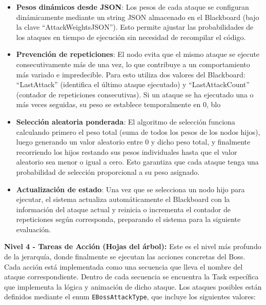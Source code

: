 \documentclass[informe]{upropuesta}
\begin{document}
\begin{itemize}
    \item \textbf{Pesos dinámicos desde JSON}: Los pesos de cada ataque se configuran dinámicamente mediante un string JSON almacenado en el Blackboard (bajo la clave ``AttackWeightsJSON''). Esto permite ajustar las probabilidades de los ataques en tiempo de ejecución sin necesidad de recompilar el código.
    
    \item \textbf{Prevención de repeticiones}: El nodo evita que el mismo ataque se ejecute consecutivamente más de una vez, lo que contribuye a un comportamiento más variado e impredecible. Para esto utiliza dos valores del Blackboard: ``LastAttack'' (identifica el último ataque ejecutado) y ``LastAttackCount'' (contador de repeticiones consecutivas). Si un ataque se ha ejecutado una o más veces seguidas, su peso se establece temporalmente en 0, blo


    \item \textbf{Selección aleatoria ponderada}: El algoritmo de selección funciona calculando primero el peso total (suma de todos los pesos de los nodos hijos), luego generando un valor aleatorio entre 0 y dicho peso total, y finalmente recorriendo los hijos restando sus pesos individuales hasta que el valor aleatorio sea menor o igual a cero. Esto garantiza que cada ataque tenga una probabilidad de selección proporcional a su peso asignado.

\item \textbf{Actualización de estado}: Una vez que se selecciona un nodo hijo para ejecutar, el sistema actualiza automáticamente el Blackboard con la información del ataque actual y reinicia o incrementa el contador de repeticiones según corresponda, preparando el sistema para la siguiente evaluación.

\end{itemize}
\textbf{Nivel 4 - Tareas de Acción (Hojas del árbol):}
Este es el nivel más profundo de la jerarquía, donde finalmente se ejecutan las acciones concretas del Boss. Cada acción está implementada como una secuencia que lleva el nombre del ataque correspondiente. Dentro de cada secuencia se encuentra la Task específica que implementa la lógica y animación de dicho ataque.
Los ataques posibles están definidos mediante el enum \texttt{EBossAttackType}, que incluye los siguientes valores:
\end{document}
